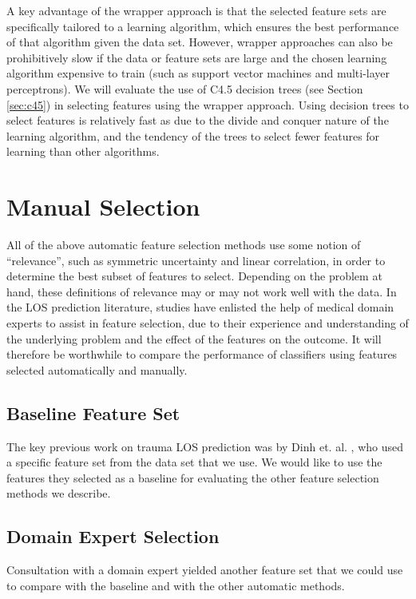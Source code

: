 \begin{figure}[h]
\label{fig:wrapper}
\caption{}
\centering
\end{figure}

A key advantage of the wrapper approach is that the selected feature sets are
specifically tailored to a learning algorithm, which ensures the best
performance of that algorithm given the data set. However, wrapper approaches
can also be prohibitively slow if the data or feature sets are large and the
chosen learning algorithm expensive to train (such as support vector machines
and multi-layer perceptrons). We will evaluate the use of C4.5 decision trees
(see Section \ref{sec:c45}) in selecting features using the wrapper approach.
Using decision trees to select features is relatively fast as due to the
divide and conquer nature of the learning algorithm, and the tendency of the
trees to select fewer features for learning than other algorithms.

\section{Manual Selection}
\label{sec:manual}
All of the above automatic feature selection methods use some notion of
``relevance'', such as symmetric uncertainty and linear correlation,
in order to determine the best subset of features to select.
Depending on the problem at hand, these definitions of relevance may or may
not work well with the data. In the LOS prediction literature, studies
have enlisted the help of medical domain experts to assist in feature
selection, due to their experience and understanding of the underlying
problem and the effect of the features on the outcome. It will therefore be
worthwhile to compare the performance of classifiers using features selected
automatically and manually.

\subsection{Baseline Feature Set}
The key previous work on trauma LOS prediction was by Dinh et. al.
\cite{Dinh2013a}, who used a specific feature set from the data set that we
use. We would like to use the features they selected as a baseline for
evaluating the other feature selection methods we describe.

\subsection{Domain Expert Selection}
Consultation with a domain expert yielded another feature set that we could
use to compare with the baseline and with the other automatic methods.

